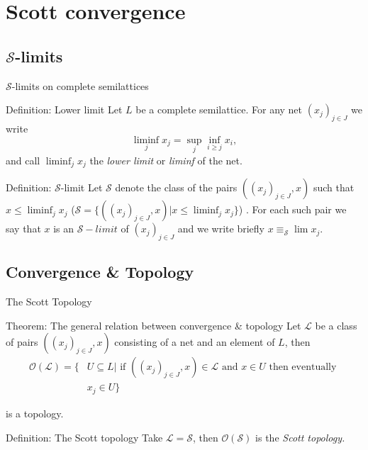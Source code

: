 \documentclass{beamer}
\begin{document}
\section{Scott convergence}
\subsection{$\mathcal{S}$-limits}
\begin{frame}{$\mathcal{S}$-limits on complete semilattices}
\begin{block}{Definition: Lower limit}
Let $L$ be a complete semilattice. For any net $(x_j)_{j\in J}$ we write
$$\liminf_j x_j = \sup_j \inf_{i \geq j} x_i,$$
and call $\liminf_j x_j$ the \emph{lower limit} or \emph{liminf} of the net.
\end{block}

\begin{block}{Definition: $\mathcal{S}$-limit}
Let $\mathcal{S}$ denote the class of the pairs $((x_j)_{j\in J}, x)$ such that $x \leq \liminf_j x_j$ ($\mathcal{S} = \{((x_j)_{j\in J}, x) | x \leq \liminf_j x_j \}$) . For each such pair we say that $x$ is an $\mathcal{S}-limit$ of $(x_j)_{j \in J}$ and we write briefly $x \equiv_{\mathcal{S}} \lim x_j$.
\end{block}
\end{frame}



\subsection{Convergence \& Topology}
\begin{frame}{The Scott Topology}
\begin{block}{Theorem: The general relation between convergence \& topology}
Let $\mathcal{L}$ be a class of pairs $((x_j)_{j\in J}, x)$ consisting of a net and an element of $L$, then
\begin{align*}
\mathcal{O}(\mathcal{L}) = \{&U \subseteq L | \text{ if } ((x_j)_{j\in J}, x) \in \mathcal{L} \text{ and } x \in U \text{ then eventually } \\
&x_j \in U\}
\end{align*}

is a topology.
\end{block}
\begin{block}{Definition: The Scott topology}
Take $\mathcal{L} = \mathcal{S}$, then $\mathcal{O}(\mathcal{S})$ is the \emph{Scott topology.}
\end{block}
\end{frame}
\end{document}
